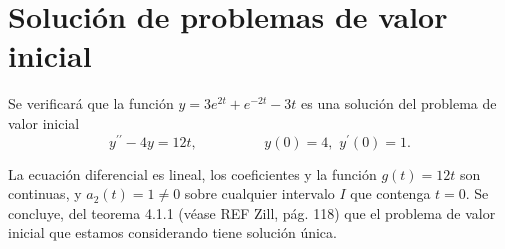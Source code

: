 \documentclass[12pt]{article}
\begin{document}
\section{Solución de problemas de valor inicial}
Se verificará que la función $y=3e^{2t}+e^{-2t}-3t$ es una solución del problema de 
valor inicial
\begin{equation}
y^{\prime\prime}-4y=12t,\hspace{2cm}y(0)=4,\,\,y^{\prime}(0)=1.
\label{Ecu0}
\end{equation}


La ecuación diferencial es lineal, los coeficientes y la función $g(t)=12t$ son continuas, 
y $a_{2}(t)=1\ne 0$ sobre cualquier intervalo $I$ que contenga $t=0$. Se concluye, del teorema 
4.1.1 (véase REF Zill, pág. 118) que el problema de valor inicial que estamos considerando 
tiene solución única.
\end{document}
